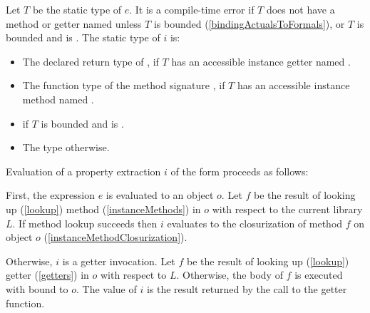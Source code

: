 \documentclass[makeidx]{article}
\begin{document}
{\LMHash{}%
Let $T$ be the static type of $e$.
It is a compile-time error if $T$ does not have a method or getter named \id{}
unless $T$ is \DYNAMIC{} bounded
(\ref{bindingActualsToFormals}),
or $T$ is \FUNCTION{} bounded and \id{} is \CALL.
The static type of $i$ is:

\begin{itemize}
\item The declared return type of ,
  if $T$ has an accessible instance getter named \id.
\item The function type of the method signature ,
  if $T$ has an accessible instance method named \id.
\item \FUNCTION{} if $T$ is \FUNCTION{} bounded and \id{} is \CALL.
\item The type \DYNAMIC{} otherwise.
\end{itemize}


\LMHash{}%
Evaluation of a property extraction $i$ of the form 
proceeds as follows:

\LMHash{}%
First, the expression $e$ is evaluated to an object $o$.
Let $f$ be the result of looking up (\ref{lookup}) method
(\ref{instanceMethods})
\id{} in $o$ with respect to the current library $L$.
If method lookup succeeds then $i$ evaluates to
the closurization of method $f$ on object $o$
(\ref{instanceMethodClosurization}).


\LMHash{}%
Otherwise, $i$ is a getter invocation.
Let $f$ be the result of looking up (\ref{lookup}) getter
(\ref{getters})
\id{} in $o$ with respect to $L$.
Otherwise, the body of $f$ is executed with \THIS{} bound to $o$.
The value of $i$ is the result returned by the call to the getter function.

}
\end{document}
